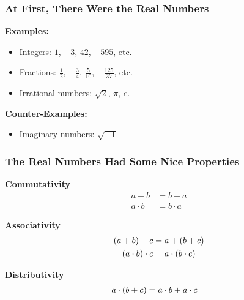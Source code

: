 \begin{frame}

\frametitle{At First, There Were the Real Numbers}

\vspace{\fill}

\textbf{Examples:}

\begin{itemize}

\item Integers: $1$, $-3$, $42$, $-595$, etc.

\item Fractions: $\frac{1}{2}$, $-\frac{3}{4}$, $\frac{5}{10}$,
$-\frac{125}{37}$, etc.

\item Irrational numbers: $\sqrt{2}$, $\pi$, $e$.

\end{itemize}

\textbf{Counter-Examples:}

\begin{itemize}

\item Imaginary numbers: $\sqrt{-1}$

\end{itemize}

\end{frame}

\begin{frame}

\frametitle{The Real Numbers Had Some Nice Properties}

\vspace{\fill}

\begin{center}

\begin{minipage}{0.5\textwidth}
\begin{center}
\textbf{Commutativity} \begin{align*}
a + b &= b + a \\
a \cdot b &= b \cdot a
\end{align*}
\end{center}
\end{minipage}%
\begin{minipage}{0.5\textwidth}
\begin{center}
\textbf{Associativity} \begin{align*}
 \mathopen{}\left(a + b\right)\mathclose{}  + c &= a +  \mathopen{}\left(b + c\right)\mathclose{}  \\
 \mathopen{}\left(a \cdot b\right)\mathclose{}  \cdot c &= a \cdot  \mathopen{}\left(b \cdot c\right)\mathclose{} 
\end{align*}
\end{center}
\end{minipage}

\vspace{\fill}

\textbf{Distributivity} \begin{align*}
a \cdot  \mathopen{}\left(b + c\right)\mathclose{}  &= a \cdot b + a \cdot c
\end{align*}

\end{center}

\vspace{\fill}

\end{frame}
